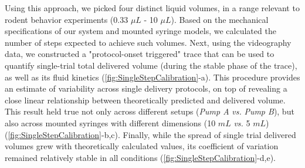 Using this approach, we picked four distinct liquid volumes, in a range relevant to rodent behavior experiments (0.33 $\mu L$ - 10 $\mu L$). Based on the mechanical specifications of our system and mounted syringe models, we calculated the number of steps expected to achieve such volumes. Next, using the videography data, we constructed a "protocol-onset triggered" trace that can be used to quantify single-trial total delivered volume (during the stable phase of the trace), as well as its fluid kinetics (\cref{fig:SingleStepCalibration}-a). This procedure provides an estimate of variability across single delivery protocols, on top of revealing a close linear relationship between theoretically predicted and delivered volume. This result held true not only across different setups (\textit{Pump A} \textit{vs.} \textit{Pump B}), but also across mounted syringes with different dimensions (10 $mL$ \textit{vs.} 5 $mL$) (\cref{fig:SingleStepCalibration}-b,c). Finally, while the spread of single trial delivered volumes grew with theoretically calculated values, its coefficient of variation remained relatively stable in all conditions (\cref{fig:SingleStepCalibration}-d,e).


